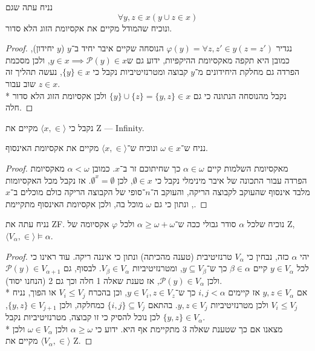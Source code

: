 \Question{}
נניח עתה שגם
\[
	\forall y, z \in x (y \cup z \in x)
\]
ונוכיח שהמודל מקיים את אקסיומת הזוג הלא סדור.
\begin{proof}
	נגדיר $\varphi(y) = \forall z, z' \in y (z = z')$ הנוסחה שקיים איבר יחיד ב־$y$ ($y$ יחידון), כמובן היא תקפה מאקסיומת ההיקפיות,
	ידוע גם ש$y \in x \implies \mathcal{P}(y) \in x$, ולכן מסכמת הפרדה גם מחלקת היחידונים מ־$y$ קבוצה ומטרנזיטיביות נקבל כי $\{ y \} \in x$, נעשה תהליך זה שוב עבור $z \in x$. \\*
	נקבל מהנוסחה הנתונה כי גם $\{ y \} \cup \{ z \} = \{ y, z \} \in x$ ולכן אקסיומת הזוג הלא סדור חלה.
\end{proof}
נקבל כי $\langle x, \in \rangle$ מקיים את Z --- Infinity.

\Question{}
נניח ש־$\omega \in x$ ונוכיח ש־$\langle x, \in \rangle$ מקיים את אקסיומת האינסוף.
\begin{proof}
	מאקסיומת השלמות קיים $\alpha \in \omega$ כך שחיתוכם זר ב־$x$.
	כמובן $\alpha < \omega$ מאקסיומת הפרדה עבור התכונה של איבר מינימלי נקבל כי $\emptyset \in x$, לכן $\emptyset^x = \emptyset$.
	אז נקבל מכל האקסיומות מלבד אינסוף שהעוקב לקבוצה הריקה, והעוקב ה־$n$־סופי של הקבוצה הריקה כולם מוכלים ב־$x$, ונתון כי גם $\omega$ מוכל בה, ולכן אקסיומת האינסוף מתקיימת.
\end{proof}

\Question{}
נניח עתה את ZF\@. נוכיח שלכל $\alpha$ סודר גבולי ככה ש־$\alpha \ge \omega + \omega$ ולכל $\varphi$ אקסיומה של Z, $\langle V_\alpha, \in \rangle \models \alpha$.
\begin{proof}
	יהי $\alpha$ כזה, נבחין כי $V_\alpha$ טרנזיטיבית (טענה מהכיתה) ונתון כי איננה ריקה. עוד ראינו כי לכל $y \in V_\alpha$ קיים $\beta \in \alpha$ כך ש־$y \subseteq V_\beta$,
	ומטרנזיטיביות $V_\beta \in V_\alpha$. לבסוף, גם $\mathcal{P}(y) \in V_{\alpha + 1}$ ולכן $\mathcal{P}(y) \in V_\alpha$, אז טענת שאלה 1 חלה וכך גם 2 (הנחנו יסוד). \\*
	אם $y, z \in V_\alpha$ אז קיימים $i, j < \alpha$ כך ש־$y \in V_i, z \in V_z$, וכן בהכרח $V_i \le V_j$ או הפוך, נניח $V_i \le V_j$ ולכן מטרנזיטיביות $y, z \in V_j$.
	בהתאם $\{ i, j \} \subseteq V_j$ כמחלקה, ולכן $\{ y, z \} \in V_{j + 1}$, לכן נוכל להסיק כי זו קבוצה, מטרנזיטיביות נקבל $\{ y, z \} \in V_\alpha$. \\*
	מצאנו אם כך שטענת שאלה 3 מתקיימת אף היא.
	ידוע כי $\alpha \ge \omega$ ולכן $\omega \in V_\alpha$ ולכן $\langle V_\alpha, \in \rangle$ מקיים את Z.
\end{proof}


